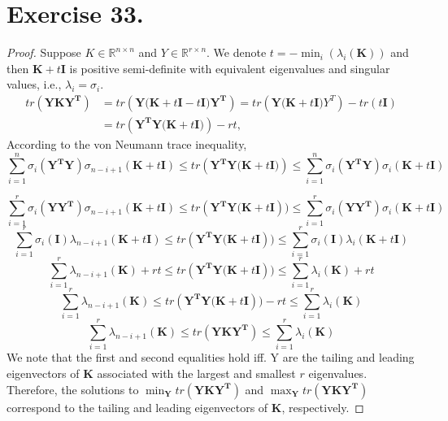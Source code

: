 \documentclass{article}
\begin{document}
\section{Exercise 33.}
\begin{proof}
Suppose $K \in \mathbb R^{n\times n}$ and $Y \in \mathbb R^{r\times n}$. We denote $t = -\min_{i}(\lambda_i(\mathbf K))$ and then $\mathbf K+t\mathbf I$ is positive semi-definite with equivalent eigenvalues and singular values, i.e., $\lambda_{i}=\sigma_i$.
\begin{align*}
tr(\mathbf{YKY^{T}}) &= tr(\mathbf{Y(K}+t\mathbf{I}- t \mathbf{I)Y^{T}}) = tr(\mathbf{Y(K}+t\mathbf{I)}Y^{T}) - tr(t\mathbf{I}) \\
&= tr(\mathbf{Y^{T}Y(K}+t\mathbf{I)}) - rt,
\end{align*}
According to the von Neumann trace inequality,
$$
\sum_{i=1}^{n}\sigma_{i}(\mathbf{Y^TY})\sigma_{n-i+1}(\mathbf{K}+t\mathbf{I}) \leq tr(\mathbf{Y^{T}Y(K}+t\mathbf{I)}) \leq \sum_{i=1}^{n}\sigma_i(\mathbf{Y^TY})\sigma_i(\mathbf{K}+t\mathbf{I})
$$

$$
\sum_{i=1}^{r}\sigma_{i}(\mathbf{YY^T})\sigma_{n-i+1}(\mathbf{K}+t\mathbf{I}) \leq tr(\mathbf{Y^{T}Y(K}+t\mathbf{I})) \leq \sum_{i=1}^{r}\sigma_i(\mathbf{YY^T})\sigma_i(\mathbf{K}+t\mathbf{I}) 
$$
$$
\sum_{i=1}^{r}\sigma_{i}(\mathbf{I})\lambda_{n-i+1}(\mathbf{K}+t\mathbf{I}) \leq tr(\mathbf{Y^{T}Y(K}+t\mathbf{I})) \leq \sum_{i=1}^{r}\sigma_i(\mathbf{I})\lambda_i(\mathbf{K}+t\mathbf{I})
$$
$$
\sum_{i=1}^{r}\lambda_{n-i+1}(\mathbf{K})+rt \leq tr(\mathbf{Y^{T}Y(K}+t\mathbf{I})) \leq \sum_{i=1}^{r}\lambda_i(\mathbf{K})+ rt 
$$
$$
\sum_{i=1}^{r}\lambda_{n-i+1}(\mathbf{K}) \leq tr(\mathbf{Y^{T}Y(K}+t\mathbf{I}))-rt\leq \sum_{i=1}^{r}\lambda_i(\mathbf{K})
$$
$$
\sum_{i=1}^{r}\lambda_{n-i+1}(\mathbf{K}) \leq tr(\mathbf{YKY^{T}})\leq \sum_{i=1}^{r}\lambda_i(\mathbf{K})
$$
We note that the first and second equalities hold iff. Y are the tailing and leading eigenvectors of $\mathbf{K}$ associated with the largest and smallest $r$ eigenvalues. Therefore, the solutions to $\min_{\mathbf Y}tr(\mathbf{YKY^{T}})$ and $\max_{\mathbf Y}tr(\mathbf{YKY^{T}})$ correspond to the tailing and leading eigenvectors of $\mathbf{K}$, respectively.
\end{proof}
\end{document}
